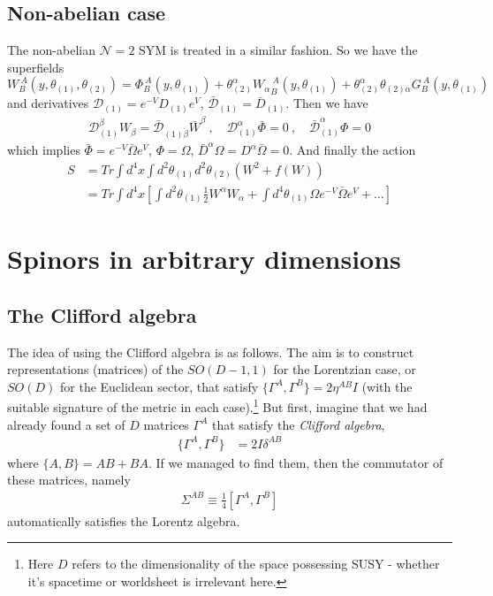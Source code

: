 \documentclass[a4paper,12pt]{article}
\numberwithin{equation}{section}
\numberwithin{exe}{section}
\newcommand{\Db}{{\bar D}}
\newcommand{\Dc}{{\mathcal D}}
\newcommand{\Dcb}{{\bar{\mathcal D}}}
\newcommand{\Wb}{{\bar W}}
\renewcommand{\a}{{\alpha}}
\newcommand{\ad}{{\dot\alpha}}
\renewcommand{\b}{{\beta}}
\newcommand{\bd}{{\dot\beta}}
\newcommand{\G}{{\Gamma}}
\renewcommand{\t}{{\theta}}
\newcommand{\Phib}{{\bar \Phi}}
\begin{document}
\subsection{Non-abelian case}
The non-abelian $\mathcal N=2$ SYM is treated in a similar fashion. So we have the superfields
	\begin{equation}
	W_B^{\ A}(y,\t_{(1)}, \t_{(2)}) = \Phi_B^{\ A}(y,\t_{(1)}) + \t^\a_{(2)} {W_\a}_B^{\ A}(y,\t_{(1)}) + \t^\a_{(2)} \t_{(2)\a} G_B^{\ A}(y,\t_{(1)})
	\end{equation}
and derivatives $\Dc_{(1)} = e^{-V} D_{(1)} e^V$, $ \Dcb_{(1)} = \bar D_{(1)}$. Then we have
	\begin{equation}
	\Dc^\b_{(1)} W_\b = \Dcb_{(1)\bd} \Wb^\bd\ ,\quad \Dc^\a_{(1)} \Phib = 0\ ,\quad \Dcb^\ad_{(1)}\Phi =0
	\end{equation}
which implies $\Phib = e^{-V} \bar\Omega e^V$, $\Phi = \Omega $, $\Db^\ad\Omega = D^\a \bar\Omega = 0$. And finally the action
	\begin{align}
	S & = Tr \int d^4x \int d^2\t_{(1)} d^2\t_{(2)} \left(W^2 + f(W)\right) \nonumber \\
	& = Tr \int d^4x \left[ \int d^2\t_{(1)} \frac12 W^\a W_\a + \int d^4\t_{(1)} \Omega e^{-V} \bar\Omega e^V + \ldots \right]
	\end{align}



\newpage

\appendix

\section{Spinors in arbitrary dimensions}

\subsection{The Clifford algebra}

The idea of using the Clifford algebra is as follows. The aim is to construct representations (matrices) of the $SO(D-1,1)$ for the Lorentzian case, or $SO(D)$ for the Euclidean sector, that satisfy $\{\G^A,\G^B\}=2\eta^{AB}I$ (with the suitable signature of the metric in each case).\footnote{Here $D$ refers to the dimensionality of the space possessing SUSY - whether it's spacetime or worldsheet is irrelevant here.} But first, imagine that we had already found a set of $D$ matrices $\G^A$ that satisfy the \textit{Clifford algebra},
	\begin{align}\label{cliff}
	\{ \G^A , \G^B \}&=2I\delta^{AB}
	\end{align}
where $\{A,B\}=AB+BA$. If we managed to find them, then the commutator of these matrices, namely
	\begin{align}\label{}
	\Sigma^{AB}\equiv \frac{1}{4}[\G^A,\G^B]
	\end{align}
automatically satisfies the Lorentz algebra.
\end{document}

